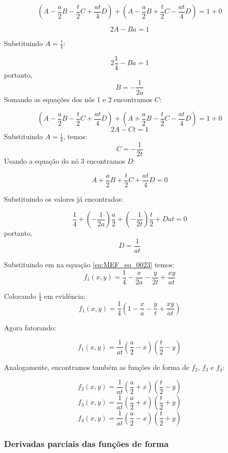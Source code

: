 \documentclass[
12pt,
a4paper,
oneside,
chapter=TITLE,
sumario=tradicional
]{abntex2}
\begin{document}
$$  
(A - \frac{a}{2}B - \frac{t}{2}C + \frac{at}{4}D)+(A - \frac{a}{2}B + \frac{t}{2}C - \frac{at}{4}D)=1+0  
$$

$$  
2A-Ba=1  
$$

Substituindo $A=\frac{1}{4}$:

$$  
2\frac{1}{4} -Ba=1  
$$
portanto,
$$  
B=-\frac{1}{2a}  
$$
Somando as equações dos nós 1 e 2  encontramos $C$:

$$  
(A - \frac{a}{2}B - \frac{t}{2}C + \frac{at}{4}D)+(A + \frac{a}{2}B - \frac{t}{2}C - \frac{at}{4}D)=1+0  
$$
$$  
2A-Ct=1  
$$
Substituindo $A=\frac14$, temos:
$$  
C=-\frac{1}{2t}  
$$
Usando a equação do nó 3 encontramos $D$:

$$  
	A + \frac{a}{2}B + \frac{t}{2}C + \frac{at}{4}D=0  
$$

Substituindo os valores já encontrados:

$$  
\frac{1}{4} +\left(-\frac{1}{2a}\right)\frac{a}{2} +\left(-\frac{1}{2t}\right)\frac{t}{2} +Dat =0  
$$
portanto,
$$ D = \frac{1}{at}$$

Substituindo em na equação \ref{eq:MEF_eq_0023} temos:
$$  
f_1(x,y)=\frac{1}{4}-\frac{x}{2a}-\frac{y}{2t}+\frac{xy}{at}  
$$

Colocando $\frac{1}{4}$ em evidência:
$$  
f_1(x,y)=\frac{1}{4}\left(1-\frac{x}{a}-\frac{y}{t}+\frac{xy}{at}\right)  
$$

Agora fatorando:


\begin{equation}
	f_1(x,y)=\frac{1}{at}\left(\frac{a}{2}-x\right)\left(\frac{t}{2} -y\right)
	\label{eq:MEF_eq_0024} 
\end{equation}

Analogamente, encontramos também as funções de forma de $f_2$,  $f_3$ e  $f_4$:

\begin{equation}
	f_2(x,y)=\frac{1}{at}\left(\frac{a}{2}+x\right)\left(\frac{t}{2} -y\right)
	\label{eq:MEF_eq_0025}  
\end{equation}
\begin{equation}
	f_3(x,y)=\frac{1}{at}\left(\frac{a}{2}+x\right)\left(\frac{t}{2} + y\right)
	\label{eq:MEF_eq_0026}  
\end{equation}
\begin{equation}
	f_4(x,y)=\frac{1}{at}\left(\frac{a}{2}-x\right)\left(\frac{t}{2} + y\right)
	\label{eq:MEF_eq_0027}  
\end{equation} 

 
 \subsubsection{Derivadas parciais das funções de forma}
 
\end{document}
